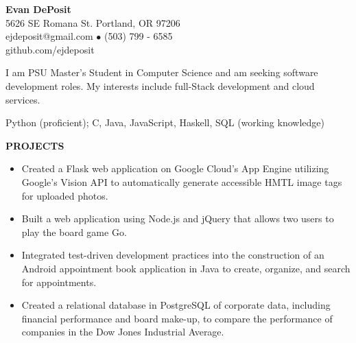 \documentclass[11pt]{article}
\begin{document}
\thispagestyle{empty}
\begin{center}
\noindent \Large{\textbf{Evan DePosit}}\\
\large{5626 SE Romana St. Portland, OR 97206}\\
\large{ejdeposit@gmail.com $\bullet$ (503) 799 - 6585}\\
\large{github.com/ejdeposit}
\end{center}
\medskip
\begin{description}[style=multiline,leftmargin=3.2cm,font=\normalfont]
\item[\textbf{OBJECTIVE:}] I am PSU Master's Student in Computer Science and am seeking software development roles. My interests include full-Stack development and cloud services.
\item[\textbf{LANGUAGES:}] Python (proficient); C, Java, JavaScript, Haskell, SQL (working knowledge)
\end{description}
\noindent
\makebox[0pt][l]{\rule[-.2\baselineskip]{\linewidth}{.3mm}} 
\large{\textbf{PROJECTS}}
\begin{itemize}[leftmargin=*, itemsep=0pt, topsep=5pt]
	\item Created a Flask web application on Google Cloud’s App Engine utilizing Google’s Vision API to automatically generate accessible HMTL image tags for uploaded photos.
	\item Built a web application using Node.js and jQuery that allows two users to play the board game Go.
	\item Integrated test-driven development practices into the construction of an Android appointment book application in Java to create, organize, and search for appointments.
	\item Created a relational database in PostgreSQL of corporate data, including financial performance and board make-up, to compare the performance of companies in the Dow Jones Industrial Average.
\end{itemize} \medskip
\end{document}
